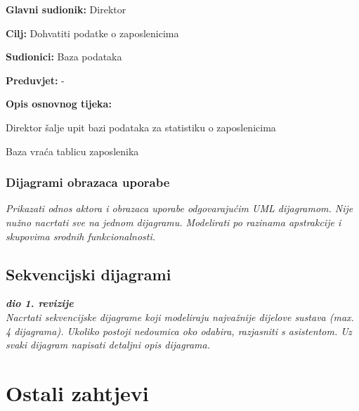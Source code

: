 				\noindent {}
				\begin{packed_item}
					
					\item \textbf{Glavni sudionik:} Direktor
					\item  \textbf{Cilj:} Dohvatiti podatke o zaposlenicima
					\item  \textbf{Sudionici:} Baza podataka
					\item  \textbf{Preduvjet:} -
					\item  \textbf{Opis osnovnog tijeka:}
					
					\item[] \begin{packed_enum}
						
						\item Direktor šalje upit bazi podataka za statistiku o zaposlenicima
						\item Baza vraća tablicu zaposlenika
						
					\end{packed_enum}
					
				\end{packed_item}
				
				\subsubsection{Dijagrami obrazaca uporabe}
					
					\textit{Prikazati odnos aktora i obrazaca uporabe odgovarajućim UML dijagramom. Nije nužno nacrtati sve na jednom dijagramu. Modelirati po razinama apstrakcije i skupovima srodnih funkcionalnosti.}
				\eject		
				
			\subsection{Sekvencijski dijagrami}
				
				\textbf{\textit{dio 1. revizije}}\\
				
				\textit{Nacrtati sekvencijske dijagrame koji modeliraju najvažnije dijelove sustava (max. 4 dijagrama). Ukoliko postoji nedoumica oko odabira, razjasniti s asistentom. Uz svaki dijagram napisati detaljni opis dijagrama.}
				\eject
	
		\section{Ostali zahtjevi}
		

